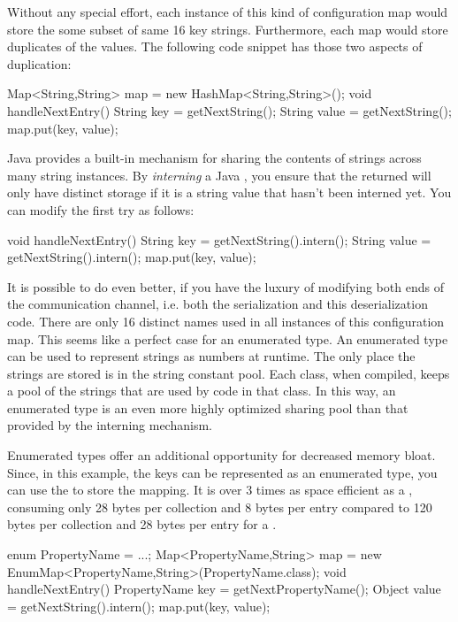 Without any special effort, each instance of this kind of configuration map
would store the some subset of same 16 key strings. Furthermore, each map would
store duplicates of the values. The following code snippet has those two
aspects of duplication:

\begin{shortlisting}
Map<String,String> map = new HashMap<String,String>();
void handleNextEntry() {
   String key = getNextString();
   String value = getNextString();
   map.put(key, value);
}
\end{shortlisting} 

Java provides a built-in mechanism for sharing the contents of strings across
many string instances. By \emph{interning} a Java
, you ensure that the returned  will only have
distinct storage if it is a string value that hasn't been interned yet. You can
modify the first try as follows:

\begin{shortlisting}
void handleNextEntry() {
   String key = getNextString().intern();
   String value = getNextString().intern();
   map.put(key, value);
}
\end{shortlisting} 

It is possible to do even better, if you have the luxury of modifying both ends
of the communication channel, i.e. both the serialization and this
deserialization code. There are only 16 distinct names used in all instances of
this configuration map. This seems like a perfect case for an enumerated type. An
enumerated type can be used to represent strings as numbers at runtime. The only
place the strings are stored is in the string constant pool. Each class, when compiled, keeps a pool of the strings that are used by
code in that class. In this way, an enumerated type is an even more highly
optimized sharing pool than that provided by the interning mechanism. 

Enumerated types offer an additional opportunity for decreased memory bloat.
Since, in this example, the keys can be represented as an enumerated type, you
can use the  to store the mapping. It is over 3 times as space
efficient as a , consuming only 28 bytes per collection and 8
bytes per entry compared to 120 bytes per collection and 28 bytes per entry for a
.

\begin{shortlisting}
enum PropertyName = {...};
Map<PropertyName,String> map = new EnumMap<PropertyName,String>(PropertyName.class);
void handleNextEntry() {
   PropertyName key = getNextPropertyName();
   Object value = getNextString().intern();
   map.put(key, value);
}
\end{shortlisting} 


